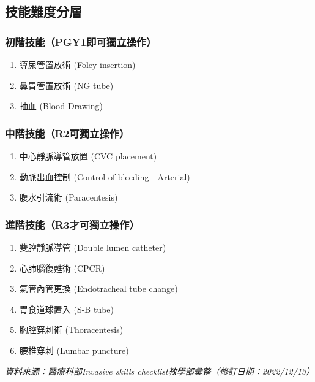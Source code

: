 \documentclass[a4paper,12pt]{article}
\begin{document}
\subsection*{技能難度分層}

\subsubsection*{初階技能（PGY1即可獨立操作）}
\begin{enumerate}
\item 導尿管置放術 (Foley insertion)
\item 鼻胃管置放術 (NG tube)
\item 抽血 (Blood Drawing)
\end{enumerate}

\subsubsection*{中階技能（R2可獨立操作）}
\begin{enumerate}
\item 中心靜脈導管放置 (CVC placement)
\item 動脈出血控制 (Control of bleeding - Arterial)
\item 腹水引流術 (Paracentesis)
\end{enumerate}

\subsubsection*{進階技能（R3才可獨立操作）}
\begin{enumerate}
\item 雙腔靜脈導管 (Double lumen catheter)
\item 心肺腦復甦術 (CPCR)
\item 氣管內管更換 (Endotracheal tube change)
\item 胃食道球置入 (S-B tube)
\item 胸腔穿刺術 (Thoracentesis)
\item 腰椎穿刺 (Lumbar puncture)
\end{enumerate}

\vspace{1em}
\noindent\textit{資料來源：醫療科部Invasive skills checklist教學部彙整（修訂日期：2022/12/13）}
\end{document}
